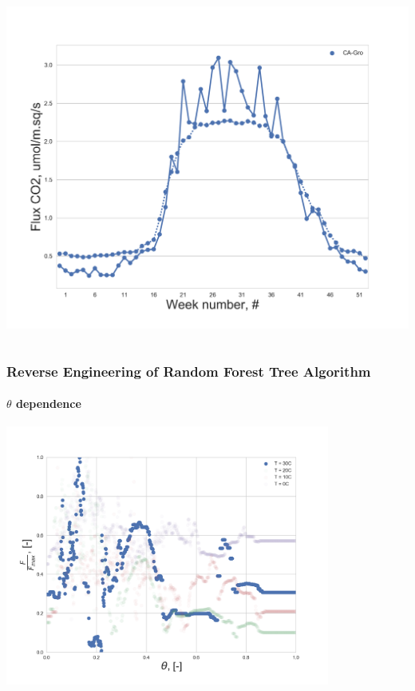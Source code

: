 \documentclass{beamer}
\begin{document}
\begin{frame}
\begin{columns}[t]
\includegraphics[width=\textwidth]{Reverse_engin_only_T/0.png}
\end{columns}

\end{frame}




\begin{frame}
\frametitle{Reverse Engineering of Random Forest Tree Algorithm}
\framesubtitle{$\theta$ dependence}

\centering
\includegraphics[width=0.8\textwidth]{Theta_dependence_30.png}

\end{frame}
\end{document}
